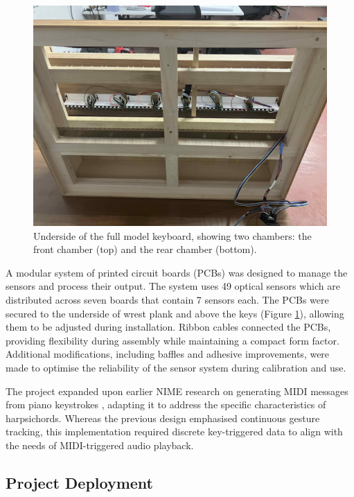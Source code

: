 \begin{figure}
  \centering
  \includegraphics[width=\linewidth]{src/images/49-key-bottom-sensors-no-keys.jpg} 
  \caption{Underside of the full model keyboard, showing two chambers: the front chamber (top) and the rear chamber (bottom).} 
  \Description{} 
  \label{fig:49-key-bottom}
\end{figure}

A modular system of printed circuit boards (PCBs) was designed to manage the sensors and process their output. The system uses 49 optical sensors which are distributed across seven boards that contain 7 sensors each. The PCBs were secured to the underside of wrest plank and above the keys (Figure \ref{fig:49-key-bottom}), allowing them to be adjusted during installation. Ribbon cables connected the PCBs, providing flexibility during assembly while maintaining a compact form factor. Additional modifications, including baffles and adhesive improvements, were made to optimise the reliability of the sensor system during calibration and use.

The project expanded upon earlier NIME research on generating MIDI messages from piano keystrokes \cite{McPherson2013}, adapting it to address the specific characteristics of harpsichords. Whereas the previous design emphasised continuous gesture tracking, this implementation required discrete key-triggered data to align with the needs of MIDI-triggered audio playback. 

\subsection{Project Deployment}

